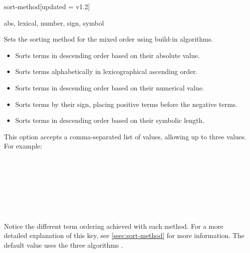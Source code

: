 \begin{option}{sort-method}[updated = v1.2]
	\begin{values}[default = {sign, symbol, abs}]
		abs, lexical, number, sign, symbol
	\end{values}
	Sets the sorting method for the mixed order using build-in algorithms.
	\begin{itemize}[widest = {}, leftmargin =*]
		\item[\val{abs}] Sorts terms in descending order based on their absolute value.
		\item[\val{lexical}] Sorts terms alphabetically in lexicographical ascending order.
		\item[\val{number}] Sorts terms in descending order based on their numerical value.
		\item[\val{sign}] Sorts terms by their sign, placing positive terms before the negative terms.
		\item[\val{symbol}] Sorts terms in descending order based on their symbolic length.
	\end{itemize}
	This option accepts a comma-separated list of values, allowing up to three values. For example:
	\begin{example}
		 \\
		 \\
		 \\
		 \\
		 \\
		 \\
	\end{example}
	Notice the different term ordering achieved with each method. For a more detailed explanation of this key, see \cref{ssec:sort-method} for more information. The default value uses the three algorithms .
\end{option}

